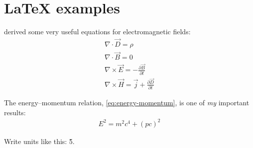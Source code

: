 \section{LaTeX examples}

 derived some very useful equations for electromagnetic
fields:
\begin{align}
    \nabla \cdot \vec{D} = \rho \\
    \nabla \cdot \vec{B} = 0 \\
    \nabla \times \vec{E} = -\frac{\partial \vec{B}}{\partial t} \\
    \nabla \times \vec{H} = \vec{j} + \frac{\partial \vec{D}}{\partial t}
\end{align}

The energy--momentum relation, \cref{eq:energy-momentum}, is one of \emph{my}
important results:
\begin{align}
    E^2 = m^2 c^4 + (p c)^2 \label{eq:energy-momentum}
\end{align}

Write units like this: \u{5}{\micro\meter}.

